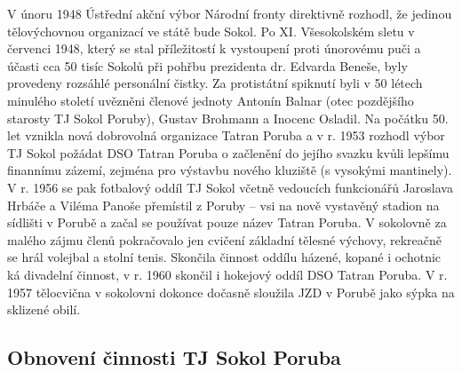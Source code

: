 \documentclass[openany]{report}
\begin{document}
V únoru 1948 Ústřední akční výbor Národní fronty direktivně rozhodl, že jedinou tělovýchovnou organizací ve státě bude Sokol. Po XI. Všesokolském sletu v červenci 1948, který se stal příležitostí k vystoupení proti únorovému puči a účasti cca 50 tisíc Sokolů při pohřbu prezidenta dr. Edvarda Beneše, byly provedeny rozsáhlé personální čistky. Za protistátní spiknutí byli v 50 létech minulého století uvězněni členové jednoty Antonín Balnar (otec pozdějšího starosty TJ Sokol Poruby), Gustav Brohmann a Inocenc Osladil. Na počátku 50. let vznikla nová dobrovolná organizace Tatran Poruba a v r. 1953 rozhodl výbor TJ Sokol požádat DSO Tatran Poruba o začlenění do jejího svazku kvůli lepšímu finannímu zázemí, zejména pro výstavbu nového kluziště (s vysokými mantinely). V r. 1956 se pak fotbalový oddíl TJ Sokol včetně vedoucích funkcionářů Jaroslava Hrbáče a Viléma Panoše přemístil z Poruby – vsi na nově vystavěný stadion na sídlišti v Porubě a začal se používat pouze název Tatran Poruba. V sokolovně za malého zájmu členů pokračovalo jen cvičení základní tělesné výchovy, rekreačně se hrál volejbal a stolní tenis. Skončila činnost oddílu házené, kopané i ochotnic ká divadelní činnost, v r. 1960 skončil i hokejový oddíl DSO Tatran Poruba. V r. 1957  tělocvična v sokolovni dokonce dočasně sloužila JZD v Porubě jako sýpka na sklizené obilí.

\subsection{Obnovení činnosti TJ Sokol Poruba}
\end{document}
